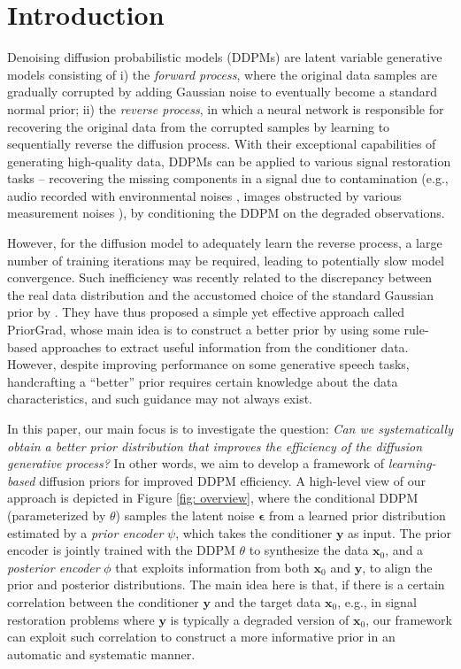 \section{Introduction}
\label{sec: intro}

Denoising diffusion probabilistic models (DDPMs) \citep{ho2020denoising,sohl2015deep} are latent variable generative models consisting of i) the \textit{forward process}, where the original data samples are gradually corrupted by adding Gaussian noise to eventually become a standard normal prior; ii) the \textit{reverse process}, in which a neural network is responsible for recovering the original data from the corrupted samples by learning to sequentially reverse the diffusion process. With their exceptional capabilities of generating high-quality data, DDPMs can be applied to various signal restoration tasks -- recovering the missing components in a signal due to contamination (e.g., audio recorded with environmental noises \citep{lu2021study,lu2022conditional,tai2023revisiting}, images obstructed by various measurement noises \citep{ozdenizci2023restoring,croitoru2023diffusion}), by conditioning the DDPM on the degraded observations.

However, for the diffusion model to adequately learn the reverse process, a large number of training iterations may be required, leading to potentially slow model convergence. Such inefficiency was recently related to the discrepancy between the real data distribution and the accustomed choice of the standard Gaussian prior by \citet{lee2021priorgrad}. They have thus proposed a simple yet effective approach called PriorGrad, whose main idea is to construct a better prior by using some rule-based approaches to extract useful information from the conditioner data. However, despite improving performance on some generative speech tasks, handcrafting a ``better'' prior requires certain knowledge about the data characteristics, and such guidance may not always exist. 

In this paper, our main focus is to investigate the question: \textit{Can we systematically obtain a better prior distribution that improves the efficiency of the diffusion generative process?} In other words, we aim to develop a framework of \textit{learning-based} diffusion priors for improved DDPM efficiency. A high-level view of our approach is depicted in Figure \ref{fig: overview}, where the conditional DDPM (parameterized by $\theta$) samples the latent noise $\boldsymbol{\epsilon}$ from a learned prior distribution estimated by a \textit{prior encoder} $\psi$, which takes the conditioner $\mathbf{y}$ as input. 
The prior encoder is jointly trained with the DDPM $\theta$ to synthesize the data $\mathbf{x}_0$, and a \textit{posterior encoder} $\phi$ that exploits information from both $\mathbf{x}_0$ and $\mathbf{y}$, to align the prior and posterior distributions. The main idea here is that, if there is a certain correlation between the conditioner $\mathbf{y}$ and the target data $\mathbf{x}_0$, e.g., in signal restoration problems where $\mathbf{y}$ is typically a degraded version of $\mathbf{x}_0$, our framework can exploit such correlation to construct a more informative prior in an automatic and systematic manner.

